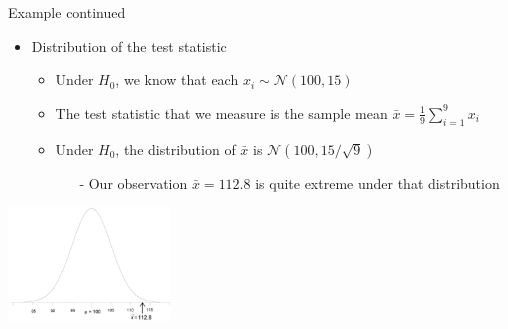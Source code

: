 \begin{frame}[c]{Example continued}

\begin{itemize}

\item \alert{Distribution of the test statistic} 
\begin{itemize}
\item Under $H_0$, we know that each $x_i \sim \mathcal{N}(100,15)$
\smallskip
\item The \alert{test statistic} that we measure is the sample
mean $\bar{x} = \frac{1}{9} \sum_{i=1}^9 x_i$
\bigskip
\pause
\item Under $H_0$, the distribution of $\bar{x}$ is
$\mathcal{N}(100,15/\sqrt{9})$
\begin{itemize}
\item[-] Our observation $\bar{x}=112.8$ is quite extreme under that
distribution
\end{itemize}
\end{itemize}	
\end{itemize}

\begin{center}
\includegraphics[height=3cm]{images/z_test_1.png}
\end{center}

\end{frame}

